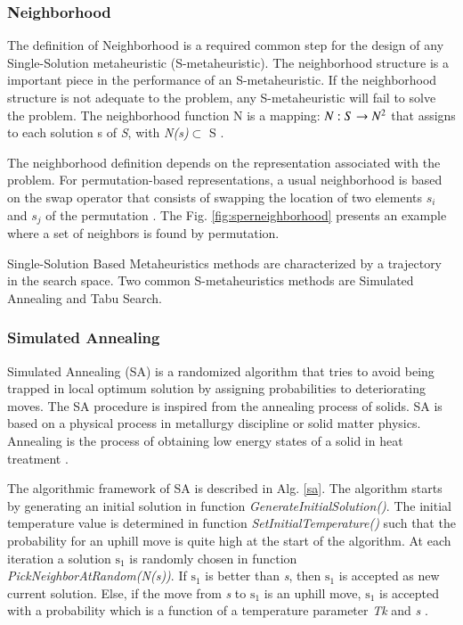 \subsubsection{Neighborhood}

The definition of Neighborhood is a required common step for the design of any Single-Solution metaheuristic (S-metaheuristic). The neighborhood structure is a important piece in the performance of an S-metaheuristic. If the neighborhood structure is not adequate to the problem,
any S-metaheuristic will fail to solve the problem. The neighborhood function N is a mapping: $ N : S \rightarrow N\textsuperscript{2} $ that assigns to each solution s of \textit{S}, with \textit{N(s)}$\subset$ S \citep{Talbi2013}.

The neighborhood definition depends on the representation associated with the problem. For permutation-based representations, a usual neighborhood is based on the swap operator that consists of swapping the location of two elements $s_i$ and $s_j$ of the permutation \citep{Talbi2013}. The Fig. \ref{fig:sperneighborhood} presents an example where a set of neighbors is found by permutation. 

Single-Solution Based Metaheuristics methods are characterized by a trajectory in the search space. Two common S-metaheuristics methods are Simulated Annealing and Tabu Search.


\subsubsection{Simulated Annealing}

Simulated Annealing (SA) is a randomized algorithm that tries to avoid being trapped in local optimum solution by assigning probabilities to deteriorating moves. The SA procedure is inspired from the annealing process of solids. SA is based on a physical
process in metallurgy discipline or solid matter physics. Annealing is the process of obtaining low energy states of a solid in heat treatment \citep{Jaziri2008}. 

The algorithmic framework of SA is described in Alg. \ref{sa}.  The algorithm starts by generating an initial solution in function \textit{GenerateInitialSolution()}. The initial temperature value is determined in function \textit{SetInitialTemperature()} such that the probability for an uphill move is quite high at the start of the algorithm. At each iteration a solution $\mbox{s}_1$ is randomly chosen in function \textit{PickNeighborAtRandom(N(s))}. If \textit{$\mbox{s}_1$} is better than \textit{s}, then \textit{$\mbox{s}_1$} is accepted as new current solution. Else, if the move from \textit{s} to \textit{$\mbox{s}_1$} is an uphill move, \textit{$\mbox{s}_1$}  is accepted with a probability which is a function of a temperature parameter \textit{Tk} and \textit{s} \citep{raidl2010metaheuristic}. 

